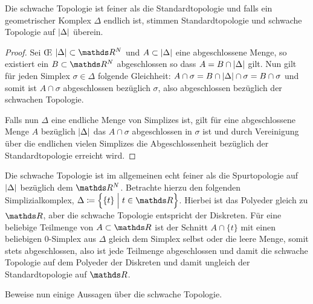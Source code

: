 \begin{Lem}
  Die schwache Topologie ist feiner als die Standardtopologie und
  falls ein geometrischer Komplex $\Delta$ endlich ist, stimmen
  Standardtopologie und schwache Topologie auf $\left| \Delta \right|$ überein.
  \begin{proof}
    Sei \OE\; $\gr{\Delta} \subset \R^N$ und $A \subset \left| \Delta \right|$
    eine abgeschlossene Menge, so existiert ein $B \subset \R^N$
    abgeschlossen so dass $A = B \cap \left| \Delta \right|$ gilt. Nun gilt für
    jeden Simplex $\sigma \in \Delta$ folgende Gleichheit:
    $A \cap \sigma = B \cap \left| \Delta \right| \cap \sigma = B \cap \sigma$
    und somit ist $A \cap \sigma$ abgeschlossen bezüglich $\sigma$,
    also abgeschlossen bezüglich der schwachen Topologie.
		
    Falls nun $\Delta$ eine endliche Menge von Simplizes ist, gilt für
    eine abgeschlossene Menge $A$ bezüglich $\left| \Delta \right|$ das
    $A \cap \sigma$ abgeschlossen in $\sigma$ ist und durch
    Vereinigung über die endlichen vielen Simplizes die
    Abgeschlossenheit bezüglich der Standardtopologie erreicht wird.
  \end{proof}
\end{Lem}

\begin{Bem}
  Die schwache Topologie ist im allgemeinen echt feiner als die
  Spurtopologie auf $\left| \Delta \right|$ bezüglich dem $\R^N$. Betrachte
  hierzu den folgenden Simplizialkomplex,
  $\Delta \coloneqq \set{ \{t\} }{t \in \R}$.  Hierbei ist das Polyeder
  gleich zu $\R$, aber die schwache Topologie entspricht der
  Diskreten. Für eine beliebige Teilmenge von $A \subset \R$ ist der
  Schnitt $A \cap \{ t \}$ mit einen beliebigen $0$-Simplex aus
  $\Delta$ gleich dem Simplex selbst oder die leere Menge, somit stets
  abgeschlossen, also ist jede Teilmenge abgeschlossen und damit die
  schwache Topologie auf dem Polyeder der Diskreten und damit ungleich
  der Standardtopologie auf $\R$.
\end{Bem}

Beweise nun einige Aussagen über die schwache Topologie.

